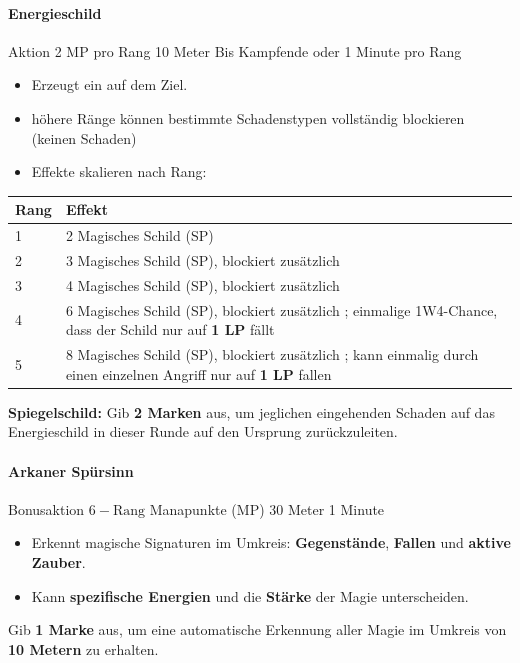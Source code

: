 \paragraph*{Energieschild}
\spellcard
{}
{Aktion}
{2 MP pro Rang}
{10 Meter}
{Bis Kampfende oder 1 Minute pro Rang}
{
	\begin{itemize}
		\item Erzeugt ein  auf dem Ziel.
		\item höhere Ränge können bestimmte Schadenstypen vollständig blockieren (keinen Schaden)
		\item Effekte skalieren nach Rang:
	\end{itemize}
	
	\begin{center}
		\begin{tabular}{lp{10cm}}
			\toprule
			\textbf{Rang} & \textbf{Effekt} \\
			\midrule
			1 & 2 Magisches Schild (SP) \\
			2 & 3 Magisches Schild (SP), blockiert zusätzlich \termref[Feuerschaden]{feuerschaden} \\
			3 & 4 Magisches Schild (SP), blockiert zusätzlich  \termref[Elementarschaden]{elementarschaden} \\
			4 & 6 Magisches Schild (SP), blockiert zusätzlich \termref[Elementarschaden]{elementarschaden};
			\newline einmalige 1W4-Chance, dass der Schild nur auf \textbf{1 LP} fällt \\
			5 & 8 Magisches Schild (SP), blockiert zusätzlich \termref[Elementarschaden]{elementarschaden};
			\newline kann einmalig durch einen einzelnen Angriff nur auf \textbf{1 LP} fallen \\
			\bottomrule
		\end{tabular}
	\end{center}
}
{
	\textbf{Spiegelschild:} Gib \textbf{2 Marken} aus, um jeglichen eingehenden Schaden auf das Energieschild
	in dieser Runde auf den Ursprung zurückzuleiten.
}

\paragraph*{Arkaner Spürsinn}
\spellcard
{}
{Bonusaktion}
{$6 - \text{Rang}$ Manapunkte (MP)}
{30 Meter}
{1 Minute}
{
	\begin{itemize}
		\item Erkennt magische Signaturen im Umkreis: \textbf{Gegenstände}, \textbf{Fallen} und \textbf{aktive Zauber}.
		\item Kann \textbf{spezifische Energien} und die \textbf{Stärke} der Magie unterscheiden.
	\end{itemize}
}
{
	Gib \textbf{1 Marke} aus, um eine automatische Erkennung aller Magie im Umkreis von \textbf{10 Metern} zu erhalten.
}

